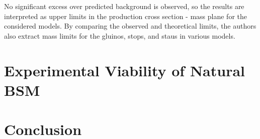 \documentclass[12pt]{article}
\begin{document}
            No significant excess over predicted background is observed, so the results are interpreted as upper limits in the production cross section - mass plane for the considered models. By comparing the observed and theoretical limits, the authors also extract mass limits for the gluinos, stops, and staus in various models.

\section{Experimental Viability of Natural BSM}

\section{Conclusion}

\clearpage
\pagebreak
\singlespacing
{}

\end{document}

